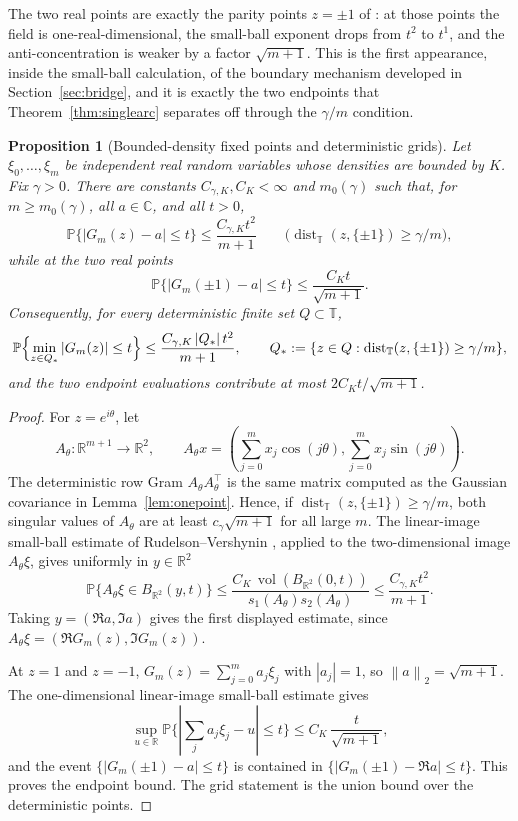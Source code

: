 \documentclass[11pt]{amsart}
\numberwithin{equation}{section}
\newtheorem{proposition}[theorem]{Proposition}
\theoremstyle{definition}
\theoremstyle{remark}
\newcommand{\C}{\mathbb C}
\newcommand{\R}{\mathbb R}
\newcommand{\T}{\mathbb T}
\newcommand{\Prob}{\mathbb P}
\newcommand{\dist}{\operatorname{dist}}
\newcommand{\norm}[1]{\left\lVert #1\right\rVert}
\newcommand{\abs}[1]{\left\lvert #1\right\rvert}
\begin{document}
The two real points are exactly the parity points $z=\pm1$ of \cite{Parity}: at those points the field is one-real-dimensional, the small-ball exponent drops from $t^2$ to $t^1$, and the anti-concentration is weaker by a factor $\sqrt{m+1}$. This is the first appearance, inside the small-ball calculation, of the boundary mechanism developed in Section~\ref{sec:bridge}, and it is exactly the two endpoints that Theorem~\ref{thm:singlearc} separates off through the $\gamma/m$ condition.

\begin{proposition}[Bounded-density fixed points and deterministic grids]\label{prop:nongaussian-grid}
Let \(\xi_0,\dots,\xi_m\) be independent real random variables whose densities
are bounded by \(K\).  Fix \(\gamma>0\).  There are constants
\(C_{\gamma,K},C_K<\infty\) and \(m_0(\gamma)\) such that, for \(m\ge m_0(\gamma)\), all
\(a\in\C\), and all \(t>0\),
\[
  \Prob\{\abs{G_m(z)-a}\le t\}
  \le \frac{C_{\gamma,K}t^2}{m+1}
  \qquad
  \bigl(\dist_\T(z,\{\pm1\})\ge\gamma/m\bigr),
\]
while at the two real points
\[
  \Prob\{\abs{G_m(\pm1)-a}\le t\}
  \le \frac{C_Kt}{\sqrt{m+1}}.
\]
Consequently, for every deterministic finite set \(Q\subset\T\),
\[
  \Prob\Bigl\{\min_{z\in Q_*}\abs{G_m(z)}\le t\Bigr\}
  \le \frac{C_{\gamma,K}\abs{Q_*}t^2}{m+1},
  \qquad
  Q_*:=\{z\in Q:\dist_\T(z,\{\pm1\})\ge\gamma/m\},
\]
and the two endpoint evaluations contribute at most \(2C_Kt/\sqrt{m+1}\).
\end{proposition}

\begin{proof}
For \(z=e^{i\theta}\), let
\[
  A_\theta:\R^{m+1}\to\R^2,\qquad
  A_\theta x=\left(\sum_{j=0}^m x_j\cos(j\theta),
                  \sum_{j=0}^m x_j\sin(j\theta)\right).
\]
The deterministic row Gram \(A_\theta A_\theta^\top\) is the same matrix
computed as the Gaussian covariance in Lemma~\ref{lem:onepoint}.  Hence, if
\(\dist_\T(z,\{\pm1\})\ge\gamma/m\), both singular values of \(A_\theta\) are at
least \(c_\gamma\sqrt{m+1}\) for all large \(m\).  The linear-image small-ball
estimate of Rudelson--Vershynin \cite{RudelsonVershynin2015}, applied to the
two-dimensional image \(A_\theta\xi\), gives uniformly in \(y\in\R^2\)
\[
  \Prob\{A_\theta\xi\in B_{\R^2}(y,t)\}
  \le
  \frac{C_K\,\operatorname{vol}(B_{\R^2}(0,t))}
       {s_1(A_\theta)s_2(A_\theta)}
  \le \frac{C_{\gamma,K}t^2}{m+1}.
\]
Taking \(y=(\Re a,\Im a)\) gives the first displayed estimate, since
\(A_\theta\xi=(\Re G_m(z),\Im G_m(z))\).

At \(z=1\) and \(z=-1\), \(G_m(z)=\sum_{j=0}^m a_j\xi_j\) with
\(\abs{a_j}=1\), so \(\norm{a}_2=\sqrt{m+1}\).  The one-dimensional
linear-image small-ball estimate gives
\[
  \sup_{u\in\R}\Prob\{\abs{\sum_j a_j\xi_j-u}\le t\}
  \le C_K\,\frac{t}{\sqrt{m+1}},
\]
and the event \(\{\abs{G_m(\pm1)-a}\le t\}\) is contained in
\(\{\abs{G_m(\pm1)-\Re a}\le t\}\).  This proves the endpoint bound.  The grid
statement is the union bound over the deterministic points.
\end{proof}
\end{document}

